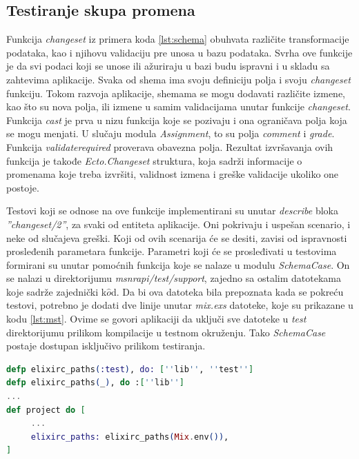 \documentclass[12pt,oneside]{memoir}
\begin{document}
\subsection{Testiranje skupa promena}
\label{sec:change}
\par Funkcija \emph{changeset} iz primera koda \ref{lst:schema} obuhvata različite transformacije podataka, kao i njihovu validaciju pre unosa u bazu podataka. Svrha ove funkcije je da svi podaci koji se unose ili ažuriraju u bazi budu ispravni i u skladu sa zahtevima aplikacije. Svaka od shema ima svoju definiciju polja i svoju \emph{changeset} funkciju. Tokom razvoja aplikacije, shemama se mogu dodavati različite izmene, kao što su nova polja, ili izmene u samim validacijama unutar funkcije \emph{changeset}. Funkcija \emph{cast} je prva u nizu funkcija koje se pozivaju i ona ograničava polja koja se mogu menjati. U slučaju modula \emph{Assignment}, to su polja \emph{comment} i \emph{grade}. Funkcija \emph{validate{\textunderscore}required} proverava obavezna polja. Rezultat izvršavanja ovih funkcija je takođe \emph{Ecto.Changeset} struktura, koja sadrži informacije o promenama koje treba izvršiti, validnost izmena i greške validacije ukoliko one postoje.
\par Testovi koji se odnose na ove funkcije implementirani su unutar \emph{describe} bloka \emph{''changeset/2''}, za svaki od entiteta aplikacije. Oni pokrivaju i uspešan scenario, i neke od slučajeva greški. Koji od ovih scenarija će se desiti, zavisi od ispravnosti prosleđenih parametara funkcije. Parametri koji će se prosleđivati u testovima formirani su unutar pomoćnih funkcija koje se nalaze u modulu \emph{SchemaCase}. On se nalazi u direktorijumu \emph{msnr{\textunderscore}api/test/support}, zajedno sa ostalim datotekama koje sadrže zajednički k$\hat{o}$d. Da bi ova datoteka bila prepoznata kada se pokreću testovi, potrebno je dodati dve linije unutar \emph{mix.exs} datoteke, koje su prikazane u kodu \ref{lst:mst}. Ovime se govori aplikaciji da uključi sve datoteke u \emph{test} direktorijumu prilikom kompilacije u testnom okruženju. Tako \emph{SchemaCase} postaje dostupan isključivo prilikom testiranja.

\begin{lstlisting}[language=elixir, caption={Uključivanje datoteka iz test direktorijuma pri kompilaciji u testnom okruženju},captionpos=b, label={lst:mst}]
defp elixirc_paths(:test), do: [''lib'', ''test'']
defp elixirc_paths(_), do :[''lib'']
...
def project do [
     ...
     elixirc_paths: elixirc_paths(Mix.env()), 
]
\end{lstlisting}
\end{document}
